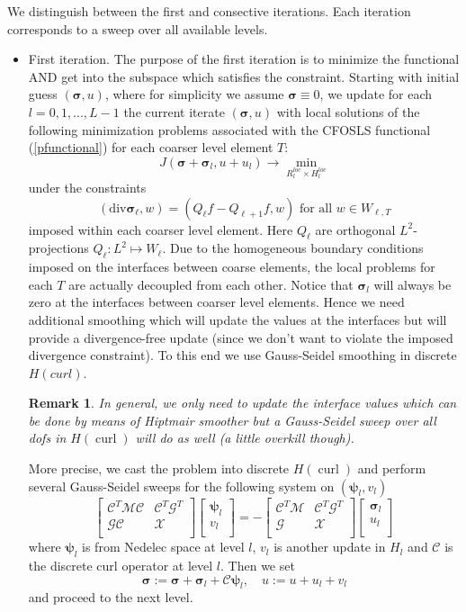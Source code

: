 \documentclass[a4paper,12pt]{amsart}
\numberwithin{equation}{section}
\newtheorem{remark}{Remark}[section]
\newcommand{\curl}{\operatorname{curl}}
\newcommand{\C}{{\mathcal C}}
\newcommand{\G}{{\mathcal G}}
\newcommand{\M}{{\mathcal M}}
\newcommand{\X}{{\mathcal X}}
\def\bpsi{{\boldsymbol \psi}}
\def\bsigma{{\boldsymbol \sigma}}
\begin{document}
We distinguish between the first and consective iterations. Each iteration corresponds to a sweep over all available levels.

\begin{itemize}
	\item First iteration. 
	The purpose of the first iteration is to minimize the functional AND get into the subspace which satisfies the constraint. Starting with initial guess $(\bsigma,u)$, where for simplicity we assume $\bsigma \equiv 0 $, we update for each $l = 0, 1, ..., L - 1$ the current iterate $(\bsigma, u)$ with local solutions of the following minimization problems associated with the CFOSLS functional (\ref{pfunctional}) for each coarser level element $T$:
$$
J(\bsigma + \bsigma_l, u + u_l) \rightarrow \min_{R_l^{loc} \times H_l^{loc}}
$$
under the constraints 
$$
(\mathrm{div} \bsigma_\ell, w )  = (Q_\ell f -Q_{\ell+1}f, w)  \text{ for all } w \in W_{\ell,T}
$$
imposed within each coarser level element.  
Here $Q_\ell$ are orthogonal $L^2$-projections $Q_\ell: L^2 \mapsto W_\ell$. \newline
	Due to the homogeneous boundary conditions imposed on the interfaces between coarse elements, the local problems for each $T$ are actually decoupled from each other.
	Notice that $\bsigma_l$ will always be zero at the interfaces between coarser level elements. Hence we need additional smoothing which will update the values at the interfaces but will provide a divergence-free update (since we don't want to violate the imposed divergence constraint).	To this end we use Gauss-Seidel smoothing in discrete $H(curl)$. 
	\begin{remark}
	In general, we only need to update the interface values which can be done by means of Hiptmair smoother but a Gauss-Seidel sweep over all dofs in $H(\curl)$ will do as well (a little overkill though).
	\end{remark}
	More precise, we cast the problem into discrete $H(\curl)$ and perform several Gauss-Seidel sweeps for the following system on $(\bpsi_l, v_l)$
$$
\begin{bmatrix}
\C^T \M \C & \C^T \G^T  \\
\G \C & \X \\
\end{bmatrix}
\begin{bmatrix}
\bpsi_l \\
v_l \\
\end{bmatrix}
=
-
\begin{bmatrix}
\C^T \M & \C^T \G^T  \\
\G & \X \\
\end{bmatrix}
\begin{bmatrix}
\bsigma_l \\
u_l \\
\end{bmatrix}
$$
where $\bpsi_l$ is from Nedelec space at level $l$, $v_l$ is another update in $H_l$ and $\C$ is the discrete curl operator at level $l$.
	Then we set
$$
 \bsigma := \bsigma + \bsigma_l + \C \bpsi_l, \quad u := u + u_l + v_l
$$	
	and proceed to the next level.


\end{itemize}
\end{document}
